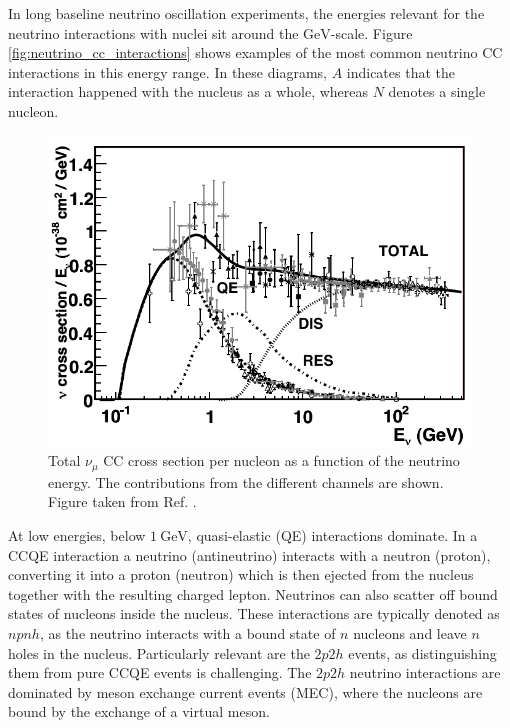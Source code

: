 In long baseline neutrino oscillation experiments, the energies relevant for the neutrino interactions with nuclei sit around the $\mathrm{GeV}$-scale. Figure \ref{fig:neutrino_cc_interactions} shows examples of the most common neutrino CC interactions in this energy range. In these diagrams, $A$ indicates that the interaction happened with the nucleus as a whole, whereas $N$ denotes a single nucleon.

\begin{figure}[t]
	\centering
	\includegraphics[width=.85\linewidth]{Images/Nu/numu_cc_cross_section.pdf}
	\caption[Total muon neutrino CC cross section per nucleon as a function of the neutrino energy.]{Total $\nu_{\mu}$ CC cross section per nucleon as a function of the neutrino energy. The contributions from the different channels are shown. Figure taken from Ref. \cite{Formaggio2012}.}
	\label{fig:numu_cc_cross_section}
\end{figure}

At low energies, below $1~\mathrm{GeV}$, quasi-elastic (QE) interactions dominate. In a CCQE interaction a neutrino (antineutrino) interacts with a neutron (proton), converting it into a proton (neutron) which is then ejected from the nucleus together with the resulting charged lepton. Neutrinos can also scatter off bound states of nucleons inside the nucleus. These interactions are typically denoted as $npnh$, as the neutrino interacts with a bound state of $n$ nucleons and leave $n$ holes in the nucleus. Particularly relevant are the $2p2h$ events, as distinguishing them from pure CCQE events is challenging. The $2p2h$ neutrino interactions are dominated by meson exchange current events (MEC), where the nucleons are bound by the exchange of a virtual meson.

